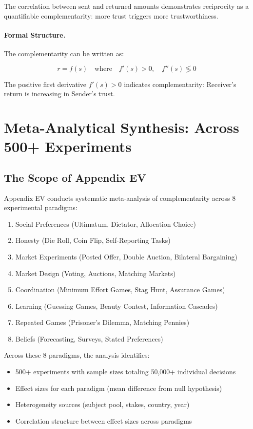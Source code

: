 \documentclass[12pt,oneside]{book}
\begin{document}
The correlation between sent and returned amounts demonstrates reciprocity as a quantifiable
complementarity: more trust triggers more trustworthiness.

\paragraph{Formal Structure.}

The complementarity can be written as:

\begin{equation}
r = f(s) \quad \text{where} \quad f'(s) > 0, \quad f''(s) \lessgtr 0
\label{eq:reciprocity}
\end{equation}

The positive first derivative $f'(s) > 0$ indicates complementarity: Receiver's return is
increasing in Sender's trust.

\section{Meta-Analytical Synthesis: Across 500+ Experiments}

\subsection{The Scope of Appendix EV}

Appendix EV conducts systematic meta-analysis of complementarity across 8 experimental paradigms:

\begin{enumerate}
  \item Social Preferences (Ultimatum, Dictator, Allocation Choice)
  \item Honesty (Die Roll, Coin Flip, Self-Reporting Tasks)
  \item Market Experiments (Posted Offer, Double Auction, Bilateral Bargaining)
  \item Market Design (Voting, Auctions, Matching Markets)
  \item Coordination (Minimum Effort Games, Stag Hunt, Assurance Games)
  \item Learning (Guessing Games, Beauty Contest, Information Cascades)
  \item Repeated Games (Prisoner's Dilemma, Matching Pennies)
  \item Beliefs (Forecasting, Surveys, Stated Preferences)
\end{enumerate}

Across these 8 paradigms, the analysis identifies:
\begin{itemize}
  \item 500+ experiments with sample sizes totaling 50,000+ individual decisions
  \item Effect sizes for each paradigm (mean difference from null hypothesis)
  \item Heterogeneity sources (subject pool, stakes, country, year)
  \item Correlation structure between effect sizes across paradigms
\end{itemize}
\end{document}
